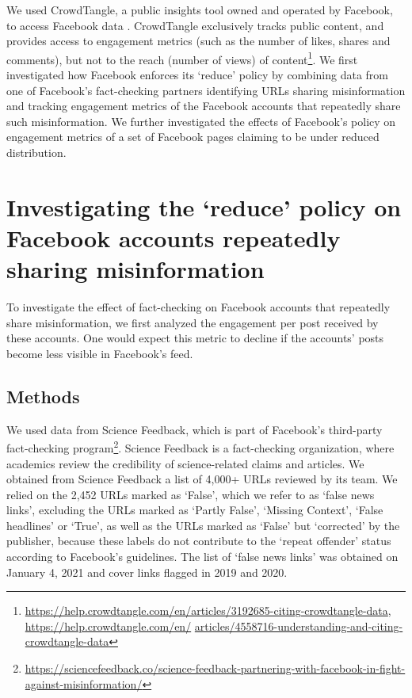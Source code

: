 \documentclass[11pt,a4paper]{article}
\begin{document}
We used CrowdTangle, a public insights tool owned and operated by Facebook, to access Facebook data \citep{team2020crowdtangle}. 
CrowdTangle exclusively tracks public content, and provides access to engagement metrics (such as the number of likes, shares and comments), but not to the reach (number of views) of content\footnote{\href{https://help.crowdtangle.com/en/articles/3192685-citing-crowdtangle-data}{https://help.crowdtangle.com/en/articles/3192685-citing-crowdtangle-data}, \href{https://help.crowdtangle.com/en/articles/4558716-understanding-and-citing-crowdtangle-data}{https://help.crowdtangle.com/en/} \href{https://help.crowdtangle.com/en/articles/4558716-understanding-and-citing-crowdtangle-data}{articles/4558716-understanding-and-citing-crowdtangle-data}}. 
We first investigated how Facebook enforces its ‘reduce’ policy by combining data from one of Facebook's fact-checking partners identifying URLs sharing misinformation and tracking engagement metrics of the Facebook accounts that repeatedly share such misinformation. 
We further investigated the effects of Facebook’s policy on engagement metrics of a set of Facebook pages claiming to be under reduced distribution.

\section{Investigating the `reduce’ policy on Facebook accounts repeatedly sharing misinformation}

To investigate the effect of fact-checking on Facebook accounts that repeatedly share misinformation, we first analyzed the engagement per post received by these accounts. One would expect this metric to decline if the accounts’ posts become less visible in Facebook’s feed.

\subsection{Methods}

We used data from Science Feedback, which is part of Facebook’s third-party fact-checking program\footnote{\href{https://sciencefeedback.co/science-feedback-partnering-with-facebook-in-fight-against-misinformation/}{https://sciencefeedback.co/science-feedback-partnering-with-facebook-in-fight-against-misinformation/}}. Science Feedback is a fact-checking organization, where academics review the credibility of science-related claims and articles. 
We obtained from Science Feedback a list of 4,000+ URLs reviewed by its team. 
We relied on the 2,452 URLs marked as `False', which we refer to as `false news links', excluding the URLs marked as `Partly False', `Missing Context', `False headlines' or `True', as well as the URLs marked as `False' but `corrected' by the publisher, because these labels do not contribute to the `repeat offender' status according to Facebook's guidelines. 
The list of `false news links' was obtained on January 4, 2021 and cover links flagged in 2019 and 2020.
\end{document}

